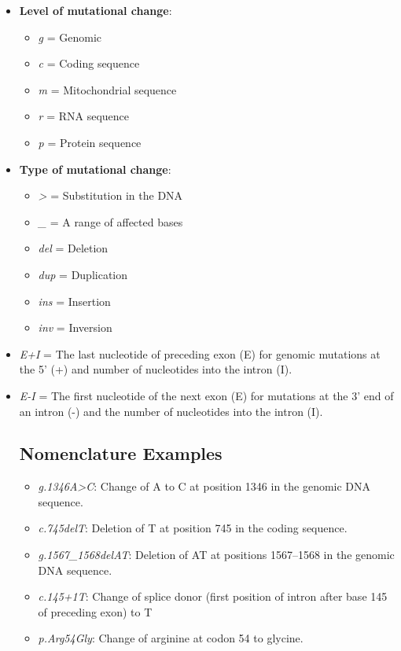 \documentclass{inVerba-notes}
\begin{document}
\begin{itemize}
  \item \textbf{Level of mutational change}:
    \begin{itemize}
      \item \emph{g} = Genomic
      \item \emph{c} = Coding sequence
      \item \emph{m} = Mitochondrial sequence
      \item \emph{r} = RNA sequence
      \item \emph{p} = Protein sequence
    \end{itemize}
  \item \textbf{Type of mutational change}:
    \begin{itemize}
      \item \emph{>} = Substitution in the DNA
      \item \emph{\_} = A range of affected bases
      \item \emph{del} = Deletion
      \item \emph{dup} = Duplication
      \item \emph{ins} = Insertion
      \item \emph{inv} = Inversion
    \end{itemize}
  \item \emph{E+I} = The last nucleotide of preceding exon (E) for genomic mutations at the 5' (+) and number of nucleotides into the intron (I).
  \item \emph{E-I} = The first nucleotide of the next exon (E) for mutations at the 3' end of an intron (-) and the number of nucleotides into the intron (I).
  \subsection{Nomenclature Examples}
  \begin{itemize}
      \item \emph{g.1346A>C}: Change of A to C at position 1346 in the genomic DNA sequence.
      \item \emph{c.745delT}: Deletion of T at position 745 in the coding sequence.
      \item \emph{g.1567\_1568delAT}: Deletion of AT at positions 1567--1568 in the genomic DNA sequence.
      \item \emph{c.145+1T}: Change of splice donor (first position of intron after base 145 of preceding exon) to T
      \item \emph{p.Arg54Gly}: Change of arginine at codon 54 to glycine.
  \end{itemize}
\end{itemize}
\end{document}
